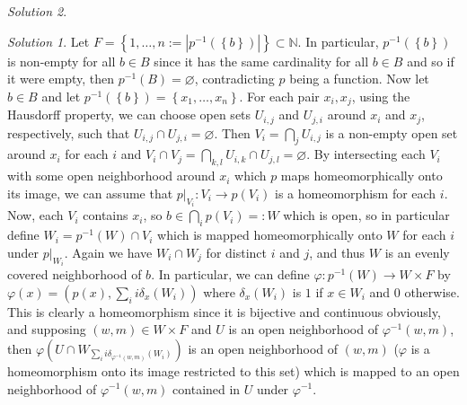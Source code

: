 \documentclass[reqno]{amsart}
\theoremstyle{definition}
\theoremstyle{remark}
\newtheorem*{solution}{Solution}
\begin{document}
\begin{solution}
        \begin{solution}
            Let $F = \left\{ 1, \ldots, n:= \left| p^{-1}\left( 
            \left\{ b \right\} \right)  \right|  \right\}\subset 
            \mathbb{N} $. In particular,
            $ p^{-1}\left( \left\{ b \right\}  \right) 
            $ is non-empty for all $b \in B$ since
            it has the same cardinality for all $b \in B$ and
            so if it were empty, then
            $p^{-1}(B) = \varnothing$, contradicting $p$ being
            a function. Now let $b \in B$ and let
            $ p^{-1}(\left\{ b \right\} ) = 
            \left\{ x_1, \ldots, x_n \right\}$. 
            For each pair $x_i, x_j$, using the Hausdorff property,
            we can choose open sets $U_{i,j}$ and
            $U_{j,i}$ around $x_i$ and $x_j$, respectively,
            such that $U_{i,j} \cap U_{j,i} = \varnothing$.
            Then $V_{i} = \bigcap_{j} U_{i,j}$ 
            is a non-empty open set around $x_i$ for each $i$ and
            $V_{i} \cap V_j = \bigcap_{k,l} U_{i,k} \cap U_{j,l}
            = \varnothing $. By intersecting each $V_i$ with
            some open neighborhood around $x_i$ which
            $p$ maps homeomorphically onto its image, we
            can assume that
            $p|_{V_i} \colon V_i \to p(V_i)$ is a homeomorphism
            for each $i$.
            Now, each $V_i$ contains  $x_i$, so
            $b \in \bigcap_{i} p(V_i) =: W$ which is
            open, so
            in particular define
            $W_i = p^{-1}(W) \cap V_i$ which is mapped
            homeomorphically onto $W$ for each $i$ under
            $p|_{W_i}$. Again we have $W_i \cap W_j$ for distinct
            $i$ and $j$, and thus $W$ is an evenly covered
            neighborhood of $b$. In particular, we can define
            $\varphi \colon 
            p^{-1}(W) \to W \times F$ by
            $\varphi(x) = \left( p(x), \sum_i i \delta_x\left( W_i
            \right)  \right) $ where
            $\delta_x (W_i)$ is $1$ if
            $x \in W_i$ and $0$ otherwise.
            This is clearly a homeomorphism since
            it is bijective and continuous obviously, and
            supposing 
            $(w,m) \in W \times F$ and
            $U$ is an open neighborhood of
            $\varphi^{-1}\left( w,m \right) $,
            then $\varphi \left( U \cap W_{\sum_i i \delta_{\varphi^{-1}(w,m)}
            (W_i)}  \right) $ is an open neighborhood
            of $(w,m)$ ($\varphi$ is a homeomorphism onto
            its image
            restricted to this set) which is mapped to
            an open neighborhood of  $\varphi^{-1}(w,m)$ 
            contained in $U$ under $\varphi^{-1}$.


\end{solution}
\end{solution}
\end{document}
